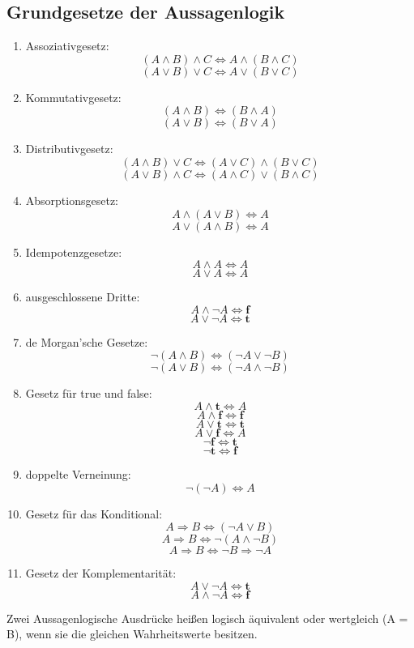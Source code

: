 \documentclass[../ana1u.tex]{subfiles}
\begin{document}
\subsection{Grundgesetze der Aussagenlogik}
\begin{enumerate}
    \item Assoziativgesetz:
    \[(A \wedge B) \wedge C \Leftrightarrow A \wedge (B \wedge C)\]
    \[(A \vee B) \vee C \Leftrightarrow A \vee (B \vee C)\]
    \item Kommutativgesetz:
    \[(A \wedge B) \Leftrightarrow (B \wedge A)\]
    \[(A \vee B) \Leftrightarrow (B \vee A)\]
    \item Distributivgesetz:
    \[(A \wedge B) \vee C \Leftrightarrow (A \vee C) \wedge (B \vee C)\]
    \[(A \vee B) \wedge C \Leftrightarrow (A \wedge C) \vee (B \wedge C)\]
    \item Absorptionsgesetz:
    \[A \wedge (A \vee B) \Leftrightarrow A\]
    \[A \vee (A \wedge B) \Leftrightarrow A\]
    \item Idempotenzgesetze:
    \[A \wedge A \Leftrightarrow A\]
    \[A \vee A \Leftrightarrow A\]
    \item ausgeschlossene Dritte:
    \[A \wedge \neg A \Leftrightarrow \textbf{f}\]
    \[A \vee \neg A \Leftrightarrow \textbf{t}\]
    \item de Morgan'sche Gesetze:
    \[\neg (A \wedge B) \Leftrightarrow (\neg A \vee \neg B)\]
    \[\neg (A \vee B) \Leftrightarrow (\neg A \wedge \neg B)\]
    \item Gesetz für true und false:
    \[A \wedge \textbf{t} \Leftrightarrow A\]
    \[A \wedge \textbf{f} \Leftrightarrow \textbf{f}\]
    \[A \vee \textbf{t} \Leftrightarrow \textbf{t}\]
    \[A \vee \textbf{f} \Leftrightarrow A\]
    \[\neg \textbf{f} \Leftrightarrow \textbf{t}\]
    \[\neg \textbf{t} \Leftrightarrow \textbf{f}\]
    \item doppelte Verneinung:
    \[\neg (\neg A) \Leftrightarrow A\]
    \item Gesetz für das Konditional:
    \[A \Rightarrow B \Leftrightarrow (\neg A \vee B)\]
    \[A \Rightarrow B \Leftrightarrow \neg (A \wedge \neg B)\]
    \[A \Rightarrow B \Leftrightarrow \neg B \Rightarrow \neg A\]
    \item Gesetz der Komplementarität:
    \[A \vee \neg A \Leftrightarrow \textbf{t}\]
    \[A \wedge \neg A \Leftrightarrow \textbf{f}\]
\end{enumerate}	
\begin{defi}
    Zwei Aussagenlogische Ausdrücke heißen logisch äquivalent oder wertgleich (A = B), wenn sie die gleichen Wahrheitswerte besitzen.
\end{defi}
\end{document}
